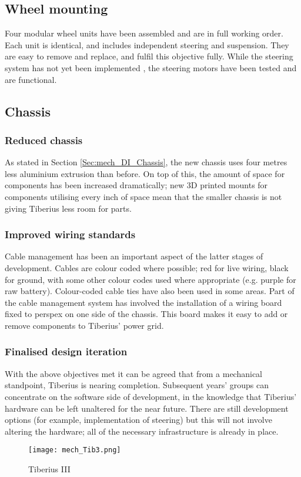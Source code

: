 \subsection{Wheel mounting}
Four modular wheel units have been assembled and are in full working order. Each unit is identical, and includes independent steering and suspension. They are easy to remove and replace, and fulfil this objective fully. While the steering system has not yet been implemented , the steering motors have been tested and are functional.

\subsection{Chassis}
\subsubsection{Reduced chassis}
As stated in Section \ref{Sec:mech_DI_Chassis}, the new chassis uses four metres less aluminium extrusion than before. On top of this, the amount of space for components has been increased dramatically; new 3D printed mounts for components utilising every inch of space mean that the smaller chassis is not giving Tiberius less room for parts.

\subsubsection{Improved wiring standards}
Cable management has been an important aspect of the latter stages of development. Cables are colour coded where possible; red for live wiring, black for ground, with some other colour codes used where appropriate (e.g. purple for raw battery). Colour-coded cable ties have also been used in some areas.
\newline
Part of the cable management system has involved the installation of a wiring board fixed to perspex on one side of the chassis. This board makes it easy to add or remove components to Tiberius' power grid.

\subsubsection{Finalised design iteration}
With the above objectives met it can be agreed that from a mechanical standpoint, Tiberius is nearing completion. Subsequent years' groups can concentrate on the software side of development, in the knowledge that Tiberius' hardware can be left unaltered for the near future. There are still development options (for example, implementation of steering) but this will not involve altering the hardware; all of the necessary infrastructure is already in place.
\begin{figure}[!htb]
\begin{center}
\texttt{[image: mech\_Tib3.png]}
\end{center}
\caption{Tiberius III}
\label{fig:mech_tib3}
\end{figure}